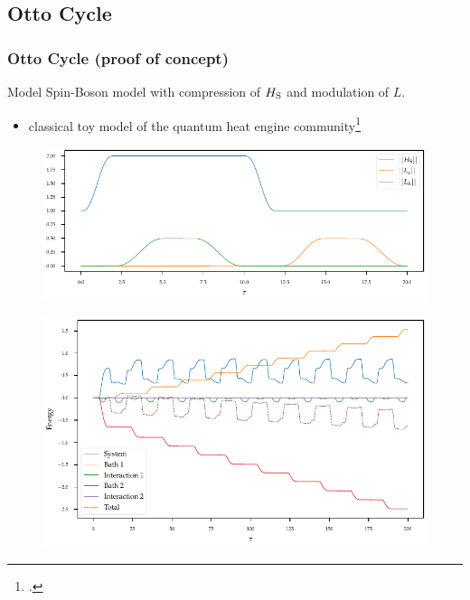\documentclass[10pt, aspectratio=169]{beamer}
\begin{document}
\subsection{Otto Cycle}
\begin{frame}
  \frametitle{Otto Cycle (proof of concept)}
  \begin{block}{Model}
    Spin-Boson model with compression of \(H_{\mathrm{S}}\) and modulation
    of \(L\).
  \end{block}
  \begin{itemize}
  \item classical toy model of the quantum heat engine community\footcite{Geva1992Feb}
  \end{itemize}
  \begin{figure}[h]
    \centering
    \includegraphics{figs/otto/modulation}
  \end{figure}
\end{frame}
\begin{frame}
  \begin{figure}[h]
    \centering
    \includegraphics{figs/otto/energy_cont}
  \end{figure}
\end{frame}
\end{document}
